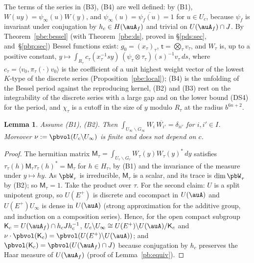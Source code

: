\documentclass[10pt]{amsart}
\newtheorem{lemma}[theorem]{Lemma}
\theoremstyle{definition}
\theoremstyle{remark}
\providecommand{\aubar}[1]{\overline{#1}}
\begin{document}
The terms of the series in (B3), (B4) are well defined: by (B1), $W(uy)=\psi_\infty(u)W(y)$, and
$\psi_\infty(u)=\aubar{\psi_f(u)}=1$ for $u\in U_c$, because $\psi_f$ is invariant under
conjugation by $h_c\in H(\auA_f)$ and trivial on $U(\auA_f)\cap J$. By Theorem~\ref{pbe:bessel}
(with Theorem~\ref{pbe:ds}, proved in \S\ref{pds:sec}, {\cite[\S3.2]{P49}} and~\S\ref{pbp:sec}) Bessel functions
exist: $g_0=(x_\tau)_\tau$, $\mathsf t=\bigotimes_\tau v_\tau$, and $W_\tau$ is, up to a positive constant,
$y\mapsto\int_{R_\tau}c_\tau(x_\tau^{-1}sy)\,(\psi_\tau\otimes\tau_\tau)(s)^{-1}v_\tau\,ds$, where
$c_\tau=\langle v_0,\pi_\tau(\cdot)v_0\rangle$ is the coefficient of a unit highest weight vector of the
lowest $K$-type of the discrete series (Proposition~\ref{pbe:local}); (B4) is the unfolding of the Bessel
period against the reproducing kernel, (B2) and (B3) rest on the integrability of the discrete
series with a large gap and on the lower bound \textup{(DS4)} for the period, and $\chi_\tau$ is a cutoff
in the size of $y$ modulo $R_\tau$ at the radius $b^{6n+2}$.

\begin{lemma}\label{pb:ortho}
Assume \textup{(B1)}, \textup{(B2)}. Then $\int_{U_\infty\backslash G_\infty}W_i\,\aubar{W_{i'}}=
\delta_{ii'}$ for $i,i'\in I$. Moreover $\nu:=\pbvol(U_c\backslash U_\infty)$ is finite and does
not depend on $c$.
\end{lemma}
\begin{proof}
The hermitian matrix $\mathsf M_\tau=\int_{U_\tau\backslash G_\tau}W_\tau(y)W_\tau(y)^*\,dy$
satisfies $\tau_\tau(h)\mathsf M_\tau\tau_\tau(h)^*=\mathsf M_\tau$ for $h\in H_\tau$, by (B1) and
the invariance of the measure under $y\mapsto hy$. As $\pbW_\tau$ is irreducible, $\mathsf M_\tau$
is a scalar, and its trace is $\dim\pbW_\tau$ by (B2); so $\mathsf M_\tau=1$. Take the product
over $\tau$. For the second claim: $U$ is a split unipotent group, so $U(E^+)$ is discrete and
cocompact in $U(\auA)$ and $U(E^+)U_\infty$ is dense in $U(\auA)$ (strong approximation for the
additive group, and induction on a composition series). Hence, for the open compact subgroup
$\mathsf K_c=U(\auA_f)\cap h_cJh_c^{-1}$, $U_c\backslash U_\infty\cong U(E^+)\backslash U(\auA)/
\mathsf K_c$ and $\nu\cdot\pbvol(\mathsf K_c)=\pbvol(U(E^+)\backslash U(\auA))$; and $\pbvol(
\mathsf K_c)=\pbvol(U(\auA_f)\cap J)$ because conjugation by $h_c$ preserves the Haar measure of
$U(\auA_f)$ (proof of Lemma~\ref{pb:equiv}).
\end{proof}
\end{document}
